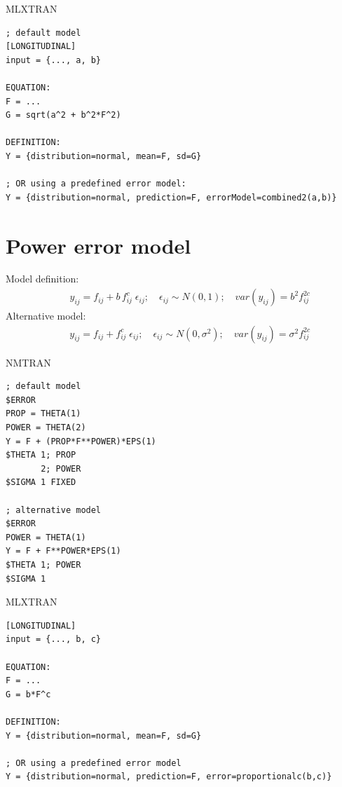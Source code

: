 \begin{lrbox}{\lstbox}\begin{minipage}{16cm}
MLXTRAN
\begin{lstlisting}[frame=single,language=MLX]
; default model
[LONGITUDINAL]
input = {..., a, b}

EQUATION:
F = ...
G = sqrt(a^2 + b^2*F^2)

DEFINITION:
Y = {distribution=normal, mean=F, sd=G}

; OR using a predefined error model:
Y = {distribution=normal, prediction=F, errorModel=combined2(a,b)}
\end{lstlisting}   
\end{minipage}\end{lrbox}
\usebox\lstbox


\section{Power error model}
\label{model4}
Model definition:
\begin{eqnarray}
&& y_{ij} = f_{ij} + b\,f_{ij}^c \; \epsilon_{ij}; \quad \epsilon_{ij} \sim N(0,1); \quad \mathit{var}(y_{ij}) = b^2f_{ij}^{2c} \nonumber
\end{eqnarray}
Alternative model: 
\begin{eqnarray}
&& y_{ij} = f_{ij} + f_{ij}^c \; \epsilon_{ij}; \quad \epsilon_{ij} \sim N(0,\sigma^2); \quad \mathit{var}(y_{ij}) = \sigma^2f_{ij}^{2c} \nonumber
\end{eqnarray}

\bigskip
\begin{lrbox}{\lstbox}\begin{minipage}{16cm}
NMTRAN
\begin{lstlisting}[frame=single,language=NM]
; default model
$ERROR
PROP = THETA(1)
POWER = THETA(2)
Y = F + (PROP*F**POWER)*EPS(1)
$THETA 1; PROP
	   2; POWER
$SIGMA 1 FIXED

; alternative model 
$ERROR
POWER = THETA(1)
Y = F + F**POWER*EPS(1)
$THETA 1; POWER
$SIGMA 1 
\end{lstlisting}   
\end{minipage}\end{lrbox}
\usebox\lstbox

\begin{lrbox}{\lstbox}\begin{minipage}{16cm}
MLXTRAN
\begin{lstlisting}[frame=single,language=MLX]
[LONGITUDINAL]
input = {..., b, c}

EQUATION:
F = ...
G = b*F^c

DEFINITION:
Y = {distribution=normal, mean=F, sd=G}

; OR using a predefined error model
Y = {distribution=normal, prediction=F, error=proportionalc(b,c)}
\end{lstlisting}   
\end{minipage}\end{lrbox}
\usebox\lstbox




